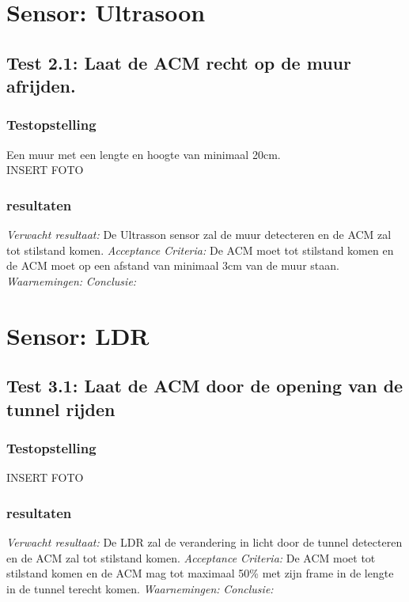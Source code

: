 \documentclass{article}
\begin{document}
\section{Sensor: Ultrasoon}
\subsection{Test 2.1: Laat de ACM recht op de muur afrijden.}
\subsubsection{Testopstelling}
Een muur met een lengte en hoogte van minimaal 20cm.\\
INSERT FOTO
\subsubsection{resultaten}
\textit{Verwacht resultaat: }De Ultrasson sensor zal de muur detecteren en de ACM zal tot stilstand komen.
\newline
\textit{Acceptance Criteria: }De ACM moet tot stilstand komen en de ACM moet op een afstand van minimaal 3cm van de muur staan.
\newline
\textit{Waarnemingen: }
\newline
\textit{Conclusie: }

\section{Sensor: LDR}
\subsection{Test 3.1: Laat de ACM door de opening van de tunnel rijden}
\subsubsection{Testopstelling} 
INSERT FOTO
\subsubsection{resultaten}
\textit{Verwacht resultaat: }De LDR zal de verandering in licht door de tunnel detecteren en de ACM zal tot stilstand komen.
\newline
\textit{Acceptance Criteria: }De ACM moet tot stilstand komen en de ACM mag tot maximaal 50\% met zijn frame in de lengte in de tunnel terecht komen.
\newline
\textit{Waarnemingen: }
\newline
\textit{Conclusie: }
\end{document}
